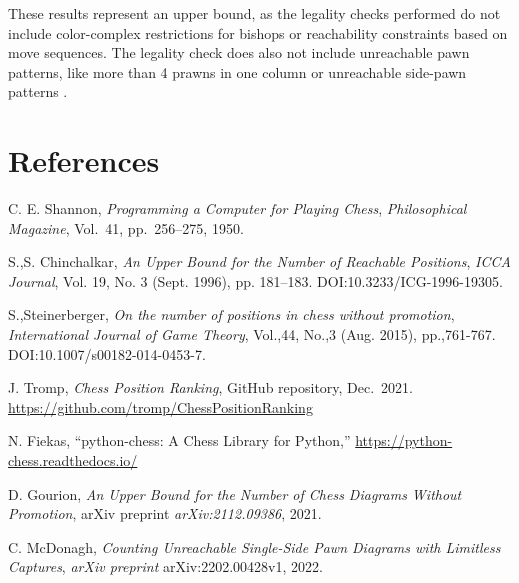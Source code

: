 \documentclass[12pt]{article}
\begin{document}
These results represent an upper bound, as the legality checks performed do not include color-complex restrictions for bishops or reachability constraints based on move sequences. The legality check does also not include unreachable pawn patterns, like more than 4 prawns in one column or unreachable side-pawn patterns \cite{mcdonagh2022}.

\section{References}

\begin{thebibliography}{9}

C. E. Shannon, \emph{Programming a Computer for Playing Chess}, 
\textit{Philosophical Magazine}, Vol.~41, pp.~256–275, 1950.

S.,S. Chinchalkar, \emph{An Upper Bound for the Number of Reachable Positions},
\textit{ICCA Journal}, Vol. 19, No. 3 (Sept. 1996), pp. 181–183. DOI:10.3233/ICG-1996-19305.

S.,Steinerberger, \emph{On the number of positions in chess without promotion},
\textit{International Journal of Game Theory}, Vol.,44, No.,3 (Aug. 2015), pp.,761-767. DOI:10.1007/s00182-014-0453-7. 

J. Tromp, \emph{Chess Position Ranking}, GitHub repository, Dec.~2021. 
\url{https://github.com/tromp/ChessPositionRanking}

N. Fiekas, “python-chess: A Chess Library for Python,” 
\url{https://python-chess.readthedocs.io/}

D. Gourion, \emph{An Upper Bound for the Number of Chess Diagrams Without Promotion}, 
arXiv preprint \textit{arXiv:2112.09386}, 2021.

C. McDonagh, \emph{Counting Unreachable Single-Side Pawn Diagrams with Limitless Captures}, 
\textit{arXiv preprint} arXiv:2202.00428v1, 2022.

\end{thebibliography}
\end{document}
